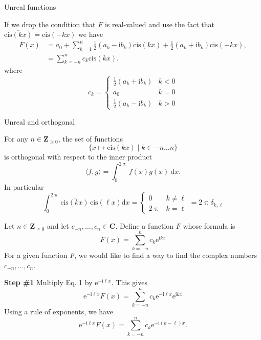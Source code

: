 \documentclass[portrait,fleqn,12pt]{beamer}
\newcommand{\complex}{\mathbf{C}}
\newcommand{\integers}{\mathbf{Z}}
\newcommand{\cis}{\mathrm{cis}}
\newcommand{\euler}{\mathrm{e}}
\newcommand{\imag}{\mathrm{i}}
\begin{document}
\begin{frame}{Unreal functions}

If we drop the condition that $F$ is real-valued and use the fact that $\overline{\cis(k x) } = \cis(-kx)$ we have
\begin{align*}
F(x)    &= a_0 + \sum_{k=1}^n \frac{1}{2} (a_k  - \imag b_k) \cis(k x) +   \frac{1}{2} (a_k  + \imag b_k) \cis(-k x) ,   \\
         &= \sum_{k=-n}^n c_k \cis(k x).
\end{align*}
where
\begin{equation*}
  c_k = \begin{cases} \frac{1}{2} (a_k  + \imag b_k) & k < 0 \\
                                       a_0 & k = 0 \\
                                       \frac{1}{2} (a_k  - \imag b_k) & k > 0
       \end{cases}
\end{equation*}
\end{frame}

\begin{frame}{Unreal and orthogonal}

For any $n \in \integers_{\geq 0}$,  the set of functions
\begin{equation*}
  \{ x \mapsto \cis(k x) \mid k \in -n \dots n \}
\end{equation*}
is orthogonal with respect to the inner product
\begin{equation*}
  \langle f, g  \rangle = \int_0^{2 \uppi} \overline{f(x)} g(x) \ \mathrm{d} x.
\end{equation*}
In particular
\begin{equation*}
 \int_0^{2 \uppi}  \overline{ \cis(k x) } \, \cis(\ell x) \mathrm{d} x = \begin{cases} 0 & k \neq \ell \\ 2 \uppi & k = \ell \end{cases}
     = 2 \uppi \delta_{k, \ell}
 \end{equation*}
\end{frame}


\begin{frame}
Let $n \in \integers_{\geq 0}$ and let $c_{-n}, \dots, c_n \in \complex$. Define a 
function $F$ whose formula is 
\begin{equation}
    F(x) = \sum_{k=-n}^n c_k \euler^{\imag  k x}
\end{equation}
For a given function $F$, we would like to find a way to find the complex numbers $c_{-n}, \dots, c_n$.

\textbf{Step \#1} Multiply Eq. 1 by $\euler^{-\imag  \ell x}$. This 
gives
\begin{equation}
    \euler^{-\imag  \ell x} F(x) = \sum_{k=-n}^n c_k 
    \euler^{-\imag  \ell x} \euler^{\imag  k x}
\end{equation}
Using a rule of exponents, we have
\begin{equation}
    \euler^{-\imag  \ell x} F(x) = \sum_{k=-n}^n c_k 
    \euler^{-\imag  (k - \ell) x}.
\end{equation}
\end{frame}
\end{document}
